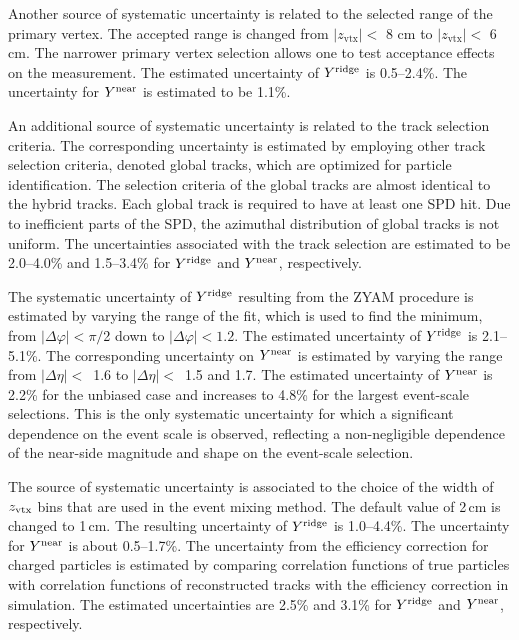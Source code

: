 Another source of systematic uncertainty is related to the selected range of the primary vertex. The accepted range is changed from $|z_\mathrm{vtx}|<$ 8 cm to $|z_\mathrm{vtx}|<$ 6 cm. The narrower primary vertex selection allows one to test acceptance effects on the measurement. The estimated uncertainty of $Y^{\rm{ridge}}$ is 0.5--2.4\%. The uncertainty for $Y^{\rm{near}}$ is estimated to be 1.1\%.

An additional source of systematic uncertainty is related to the track selection criteria. The corresponding uncertainty is estimated by employing other track selection criteria, denoted global tracks, which are optimized for particle identification. The selection criteria of the global tracks are almost identical to the hybrid tracks. Each global track is required to have at least one SPD hit. Due to inefficient parts of the SPD, the azimuthal distribution of global tracks is not uniform.
The uncertainties associated with the track selection are estimated to be 2.0--4.0\% and 1.5--3.4\% for $Y^{\rm{ridge}}$ and $Y^{\rm{near}}$, respectively.

The systematic uncertainty of $Y^{\rm{ridge}}$ resulting from the ZYAM procedure is estimated by varying the range of the fit, which is used to find the minimum, from $|\Delta\varphi|<\pi/$2 down to $|\Delta\varphi|<1.2$. The estimated uncertainty of $Y^{\rm{ridge}}$ is 2.1--5.1\%. The corresponding uncertainty on $Y^{\rm{near}}$ is estimated by varying the range from $|\Delta\eta|<$~1.6 to $|\Delta\eta|<$~1.5 and 1.7. The estimated uncertainty of $Y^{\rm{near}}$ is 2.2\% for the unbiased case and increases to 4.8\% for the largest event-scale selections. This is the only systematic uncertainty for which a significant dependence on the event scale is observed, reflecting a non-negligible dependence of the near-side magnitude and shape on the event-scale selection.

The source of systematic uncertainty is associated to the choice of the width of $z_{\rm vtx}$ bins that are used in the event mixing method. The default value of 2\,cm is changed to 1\,cm. The resulting uncertainty of $Y^{\rm{ridge}}$ is 1.0--4.4\%.
The uncertainty for $Y^{\rm{near}}$ is about 0.5--1.7\%. The uncertainty from the efficiency correction for charged particles is estimated by comparing correlation functions of true particles with correlation functions of reconstructed tracks with the efficiency correction in simulation. The estimated uncertainties are 2.5\% and 3.1\% for $Y^{\rm{ridge}}$ and $Y^{\rm{near}}$, respectively. 

